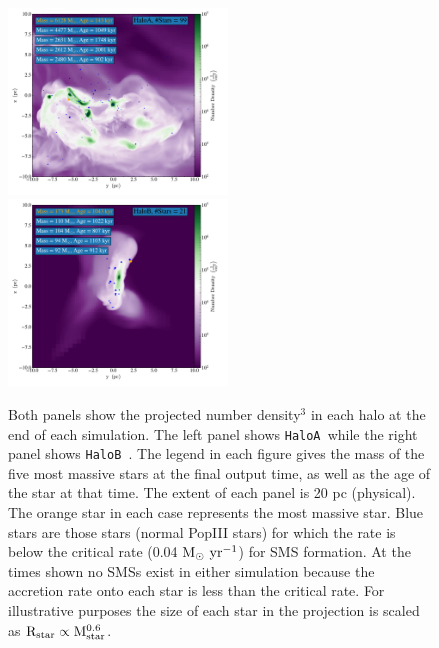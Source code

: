 \documentclass[graphics, twocolumn, usenatbib]{mn2e}
\newcommand{\msolaryrc} {$\rm{M_{\odot}~yr^{-1}}$}
\newcommand{\ha} {\texttt{HaloA~}}
\newcommand{\hb} {\texttt{HaloB~}}
\begin{document}
\begin{figure}
\centering
\begin{minipage}{175mm}      \begin{center} 
\centerline{
\includegraphics[width=0.52\textwidth]{FIGURES/HaloA/Proj_z_number_density_2001.pdf}
\includegraphics[width=0.52\textwidth]{FIGURES/HaloB/Proj_z_number_density_1103.pdf}}
\caption{Both panels show the projected number density$^3$ in each halo at the end of each simulation. The
  left panel shows \ha while the right panel shows \hb.
  The legend in each figure gives the mass of the five most massive stars at the final output time, as well as
  the age of the star at that time. The extent of each panel is 20 pc (physical). The orange
  star in each case represents the most massive star. Blue stars are those stars (normal PopIII stars) for
  which the rate is below the critical rate (0.04 \msolaryrc) for SMS formation. At the times shown no
  SMSs exist in either simulation because the accretion rate onto each star is less than the
  critical rate.  For illustrative purposes the size of each star in the
  projection is scaled as $\rm{R_{star}} \propto \rm{M_{star}^{0.6}}$.}  \label{Fig:ProjectionEnd}
\end{center} \end{minipage}

\end{figure}
\end{document}
